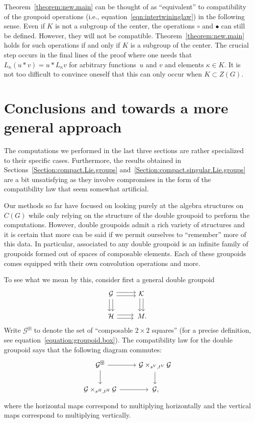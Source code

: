 \documentclass[pdftex]{sigma}
\numberwithin{equation}{section}
\theoremstyle{definition}
\newcommand{\CG}{\mathcal{G}}
\newcommand{\CH}{\mathcal{H}}
\newcommand{\CK}{\mathcal{K}}
\newcommand{\darrow}{\arrow[d, shift right] \arrow[d, shift left]}
\newcommand{\rarrow}{\arrow[r, shift right] \arrow[r, shift left]}
\begin{document}
   Theorem~\ref{theorem:new.main} can be thought of as ``equivalent'' to compatibility of the groupoid operations (i.e., equation~\eqref{eqn:intertwininglaw}) in the following sense. Even if $ K $ is not a subgroup of the center, the operations $ \circ $ and $ \bullet $ can still be defined. However, they will not be compatible. Theorem~\ref{theorem:new.main} holds for such operations if and only if $ K $ is a subgroup of the center. The crucial step occurs in the final lines of the proof where one needs that $ L_\kappa (u * v) = u * L_{\kappa} v $ for arbitrary functions~$ u $ and $ v $ and elements $ \kappa \in K $. It is not too difficult to convince oneself that this can only occur when $ K \subset Z(G) $.

\section{Conclusions and towards a more general approach}
The computations we performed in the last three sections are rather specialized to their specific cases. Furthermore, the results obtained in Sections~\ref{Section:compact.Lie.groups} and~\ref{Section:compact.singular.Lie.groups} are a bit unsatisfying as they involve compromises in the form of the compatibility law that seem somewhat artificial.

Our methods so far have focused on looking purely at the algebra structures on $ C(G) $ while only relying on the structure of the double groupoid to perform the computations. However, double groupoids admit a rich variety of structures and it is certain that more can be said if we permit ourselves to ``remember'' more of this data. In particular, associated to any double groupoid is an infinite family of groupoids formed out of spaces of composable elements. Each of these groupoids comes equipped with their own convolution operations and more.

To see what we mean by this, consider first a general double groupoid
 \begin{equation*}
  \begin{tikzcd}
\CG \darrow \rarrow & \CK \darrow \\
\CH \rarrow & \,M.
\end{tikzcd}
\end{equation*}
Write $ \CG^{\boxplus} $ to denote the set of ``composable $2\times 2$ squares'' (for a precise definition, see equation~\eqref{equation:groupoid.box}). The compatibility law for the double groupoid says that the following diagram commutes:
\[
\begin{tikzcd}
  \CG^\boxplus \arrow[r] \arrow[d] & \CG \times_{s^V,t^V} \CG \arrow[d] \\
  \CG \times_{s^H,t^H} \CG \arrow[r] &\,  \CG,
\end{tikzcd}
\]
where the horizontal maps correspond to multiplying horizontally and the vertical maps correspond to multiplying vertically.
\end{document}
